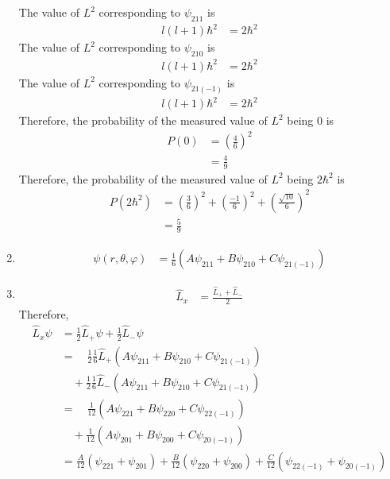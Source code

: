 \documentclass[fleqn, a4paper, 11pt, oneside]{amsart}
\theoremstyle{definition}
\theoremstyle{theorem}
\begin{document}
\begin{solution}
\begin{enumerate}[leftmargin=*]
			The value of $L^2$ corresponding to $\psi_{2 1 1}$ is
			\begin{align*}
				l (l + 1) \hbar^2 & = 2 \hbar^2
			\end{align*}
			The value of $L^2$ corresponding to $\psi_{2 1 0}$ is
			\begin{align*}
				l (l + 1) \hbar^2 & = 2 \hbar^2
			\end{align*}
			The value of $L^2$ corresponding to $\psi_{2 1 (-1)}$ is
			\begin{align*}
				l (l + 1) \hbar^2 & = 2 \hbar^2
			\end{align*}
			Therefore, the probability of the measured value of $L^2$ being $0$ is
			\begin{align*}
				P(0) & = \left( \frac{4}{6} \right)^2 \\
                                     & = \frac{4}{9}
			\end{align*}
			Therefore, the probability of the measured value of $L^2$ being $2 \hbar^2$ is
			\begin{align*}
				P\left( 2 \hbar^2 \right) & = \left( \frac{3}{6} \right)^2 + \left( \frac{-1}{6} \right)^2 + \left( \frac{\sqrt{10}}{6} \right)^2 \\
                                                          & = \frac{5}{9}
			\end{align*}
		\item
			\begin{align*}
				\psi(r,\theta,\varphi) & = \frac{1}{6} \left( A \psi_{2 1 1} + B \psi_{2 1 0} + C \psi_{2 1 (-1)} \right)
			\end{align*}
		\item
			\begin{align*}
				\hat{L}_x & = \frac{\hat{L}_+ + \hat{L}_-}{2}
			\end{align*}
			Therefore,
			\begin{align*}
				\hat{L}_x \psi & = \frac{1}{2} \hat{L}_+ \psi + \frac{1}{2} \hat{L}_- \psi                                                   \\
                                               & = \quad \frac{1}{2} \frac{1}{6} \hat{L}_+\left( A \psi_{2 1 1} + B \psi_{2 1 0} + C \psi_{2 1 (-1)} \right) \\
                                               & \quad + \frac{1}{2} \frac{1}{6} \hat{L}_-\left( A \psi_{2 1 1} + B \psi_{2 1 0} + C \psi_{2 1 (-1)} \right) \\
                                               & = \quad \frac{1}{12} \left( A \psi_{2 2 1} + B \psi_{2 2 0} + C \psi_{2 2 (-1)} \right)                     \\
                                               & \quad + \frac{1}{12} \left( A \psi_{2 0 1} + B \psi_{2 0 0} + C \psi_{2 0 (-1)} \right)                     \\
                                               & = \frac{A}{12} \left( \psi_{2 2 1} + \psi_{2 0 1} \right) + \frac{B}{12} \left( \psi_{2 2 0} + \psi_{2 0 0} \right) + \frac{C}{12} \left( \psi_{2 2 (-1)} + \psi_{2 0 (-1)} \right)
			\end{align*}
	\end{enumerate}
\end{solution}
\end{document}
